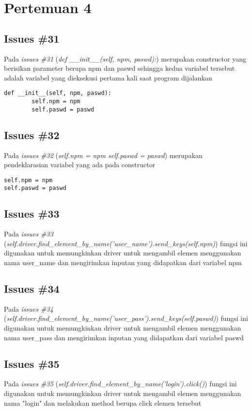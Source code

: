 \chapter{Pertemuan 4}

\section{Issues \#31}
Pada \textit{issues \#31} (\textit{def \_\_init\_\_(self, npm, paswd):}) merupakan constructor yang berisikan parameter berupa npm dan paswd sehingga kedua variabel tersebut adalah variabel yang dieksekusi pertama kali saat program dijalankan
\begin{verbatim}
def __init__(self, npm, paswd):
        self.npm = npm
        self.paswd = paswd
\end{verbatim}

\section{Issues \#32}
Pada \textit{issues \#32} (\textit{self.npm = npm self.paswd = paswd}) merupakan pendeklarasian variabel yang ada pada constructor
\begin{verbatim}
self.npm = npm
self.paswd = paswd
\end{verbatim}

\section{Issues \#33}
Pada \textit{issues \#33} (\textit{self.driver.find\_element\_by\_name('user\_name').send\_keys(self.npm)}) fungsi ini digunakan untuk memungkinkan driver untuk mengambil elemen menggunakan nama user\_name dan mengirimkan inputan yang didapatkan dari variabel npm

\section{Issues \#34}
Pada \textit{issues \#34} (\textit{self.driver.find\_element\_by\_name('user\_pass').send\_keys(self.paswd)})
fungsi ini digunakan untuk memungkinkan driver untuk mengambil elemen menggunakan nama user\_pass dan mengirimkan inputan yang didapatkan dari variabel paswd

\section{Issues \#35}
Pada \textit{issues \#35} (\textit{self.driver.find\_element\_by\_name('login').click()}) fungsi ini digunakan untuk memungkinkan driver untuk mengambil elemen menggunakan nama "login" dan melakukan method berupa click elemen tersebut

